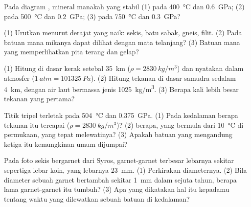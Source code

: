 \begin{exercise}[$\star$]\label{exo:g12:metamorphic-rocks:4}
Pada diagram  , mineral manakah yang stabil
(1) pada \qty{400}{\celsius} dan \qty{0.6}{GPa}; (2) pada \qty{500}{\celsius}
dan \qty{0.2}{GPa}; (3) pada \qty{750}{\celsius} dan \qty{0.3}{GPa}?
\end{exercise}

\begin{exercise}[$\star$]\label{exo:g12:metamorphic-rocks:5}
(1) Urutkan menurut derajat yang naik: sekis, batu sabak, gneis, filit.
(2) Pada batuan mana mikanya dapat dilihat dengan mata telanjang? (3) Batuan
mana yang memperlihatkan pita terang dan gelap?
\end{exercise}

\begin{exercise}[$\star\star$]\label{exo:g12:metamorphic-rocks:6}
(1) Hitung  di dasar kerak setebal \qty{35}{km}
($\rho = \qty{2830}{kg/m^3}$) dan nyatakan dalam atmosfer
($\qty{1}{atm} = \qty{101325}{Pa}$). (2) Hitung tekanan di dasar samudra
sedalam \qty{4}{km}, dengan air laut bermassa jenis \qty{1025}{kg/m^3}.
(3) Berapa kali lebih besar tekanan yang pertama?
\end{exercise}

\begin{exercise}[$\star\star$]\label{exo:g12:metamorphic-rocks:7}
Titik tripel  terletak pada \qty{504}{\celsius} dan
\qty{0.375}{GPa}. (1) Pada kedalaman berapa tekanan itu tercapai ($\rho =
\qty{2830}{kg/m^3}$)? (2)  berapa, yang bermula dari
\qty{10}{\celsius} di permukaan, yang tepat melewatinya? (3) Apakah batuan yang
mengandung ketiga  itu kemungkinan umum dijumpai?
\end{exercise}

\begin{exercise}[$\star\star$]\label{exo:g12:metamorphic-rocks:8}
Pada foto sekis bergarnet dari Syros, garnet-garnet terbesar lebarnya sekitar
sepertiga lebar koin, yang lebarnya \qty{23}{mm}. (1) Perkirakan diameternya.
(2) Bila diameter sebuah garnet bertambah sekitar \qty{1}{mm} dalam sejuta
tahun, berapa lama garnet-garnet itu tumbuh? (3) Apa yang dikatakan hal itu
kepadamu tentang waktu yang dilewatkan sebuah batuan di kedalaman?
\end{exercise}


